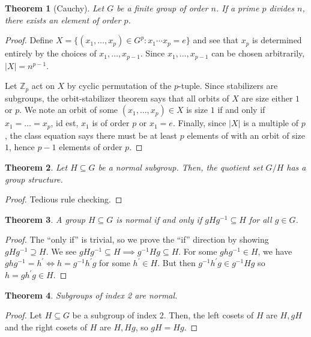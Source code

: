 \documentclass[
    parskip=half,
    toc=flat,
    toc=sectionentrydotfill,
]{scrartcl}  %
\theoremstyle{definition}
\theoremstyle{plain}
\newtheorem{theorem}{Theorem}[section]
\theoremstyle{remark}
\begin{document}
\begin{theorem}[Cauchy]
    Let $G$ be a finite group of order $n$.
    If a prime $p$ divides $n$, there exists an element of order $p$.
\end{theorem}

\begin{proof}
    Define $X=\{(x_1,\dots,x_p)\in G^p:x_1\cdots x_p=e\}$ and see that $x_p$ is determined entirely by the choices of
    $x_1,\dots,x_{p-1}$.
    Since $x_1,\dots,x_{p-1}$ can be chosen arbitrarily, $|X|=n^{p-1}$.

    Let $\mathbb{Z}_p$ act on $X$ by cyclic permutation of the $p$-tuple.
    Since stabilizers are subgroups, the orbit-stabilizer theorem says that all orbits of $X$ are size either $1$ or
    $p$.
    We note an orbit of some $(x_1,\dots,x_p)\in X$ is size $1$ if and only if $x_1=\dots=x_p$, id est, $x_1$ is of
    order $p$ or $x_1=e$.
    Finally, since $|X|$ is a multiple of $p$, the class equation says there must be at least $p$ elements of with an
    orbit of size $1$, hence $p-1$ elements of order $p$.
\end{proof}

\begin{theorem}
    Let $H\subseteq G$ be a normal subgroup.
    Then, the quotient set $G/H$ has a group structure.
\end{theorem}

\begin{proof}
    Tedious rule checking.
\end{proof}

\begin{theorem}
    A group $H\subseteq G$ is normal if and only if $gHg^{-1}\subseteq H$ for all $g\in G$.
\end{theorem}

\begin{proof}
    The ``only if'' is trivial, so we prove the ``if'' direction by showing $gHg^{-1}\supseteq H$.
    We see $gHg^{-1}\subseteq H\implies g^{-1}Hg\subseteq H$.
    For some $ghg^{-1}\in H$, we have $ghg^{-1}=h^\prime\iff h=g^{-1}h^\prime g$ for some $h^\prime\in H$.
    But then $g^{-1}h^\prime g\in g^{-1}Hg$ so $h=gh^\prime g\in H$.
\end{proof}

\begin{theorem}
    Subgroups of index 2 are normal.
\end{theorem}

\begin{proof}
    Let $H\subseteq G$ be a subgroup of index 2.
    Then, the left cosets of $H$ are $H,gH$ and the right cosets of $H$ are $H,Hg$, so $gH=Hg$.
\end{proof}
\end{document}
